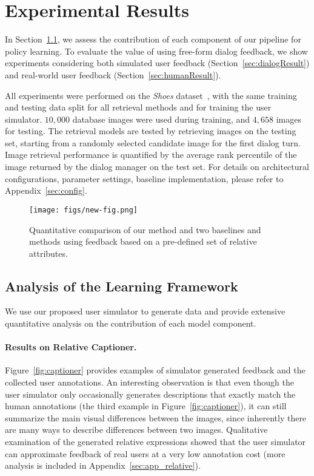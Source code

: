 \section{Experimental Results}
\label{sec:experiment}

In Section~\ref{sec:rlResult}, we assess the contribution of each component of our pipeline for policy learning. To evaluate the value of using free-form dialog feedback, 
we show experiments considering both simulated user feedback (Section~\ref{sec:dialogResult}) 
and real-world user feedback (Section~\ref{sec:humanResult}). 

All experiments were performed on the {\em Shoes} 
dataset~\cite{berg2010}, with the same training and testing data split
for all retrieval methods and for training the user simulator. 
$10,000$ database images were used during training, and $4,658$
images for testing. The retrieval models are tested by retrieving images on the testing set, starting from a randomly selected candidate image for the first dialog turn. 
Image retrieval performance is quantified by the average rank percentile 
of the image returned by the dialog manager on the test set.
For details on architectural configurations, parameter settings, 
baseline implementation, please refer to Appendix~\ref{sec:config}. 

\begin{wrapfigure}{r}{7cm}
\vspace*{-1.5em}
\texttt{[image: figs/new-fig.png]}
\caption{
Quantitative comparison of our method and two baselines and
methods using feedback based on a pre-defined set of relative attributes. }
\label{fig:quan_result}
\vspace*{-1.5em}
\end{wrapfigure} 

\subsection{Analysis of the Learning Framework}
\label{sec:rlResult}
We use our proposed user simulator to generate data and provide
extensive quantitative analysis %
on the contribution
of each model component. 


\paragraph{Results on Relative Captioner.} Figure~\ref{fig:captioner} provides examples of simulator generated 
feedback and the collected user annotations. An interesting 
observation is that even though the user simulator only occasionally 
generates descriptions that exactly match the human annotations 
(the third example in Figure~\ref{fig:captioner}),
it can still summarize the main visual differences
between the images, since inherently there are many ways 
to describe differences between two images. Qualitative 
examination of the generated relative expressions showed that the user 
simulator can approximate feedback of real users at a very low annotation cost 
(more analysis is included in Appendix~\ref{sec:app_relative}).

